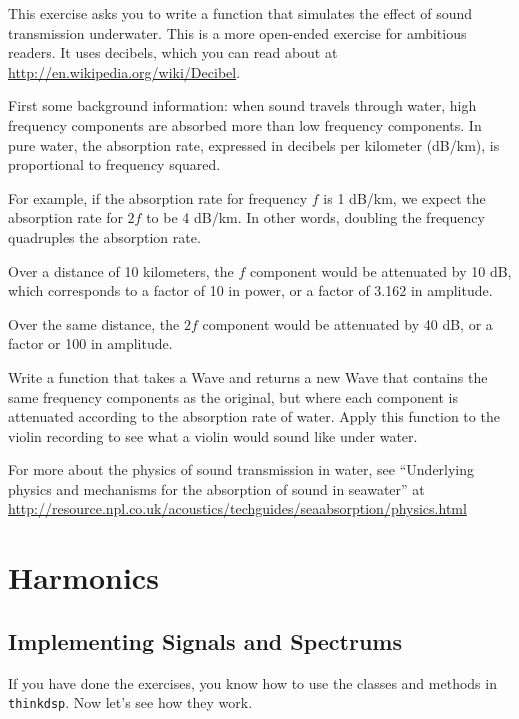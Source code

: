 \documentclass[12pt]{book}
\begin{document}
\begin{exercise}
This exercise asks you to write a function that simulates the
effect of sound transmission underwater.
This is a more open-ended exercise for ambitious readers.
It uses decibels, which you can read about at
\url{http://en.wikipedia.org/wiki/Decibel}.

First some background information: when sound travels through water,
high frequency components are absorbed more than low frequency
components.  In pure water, the absorption rate, expressed in decibels
per kilometer (dB/km), is proportional to frequency squared.

For example, if the absorption rate for frequency $f$ is 1 dB/km,
we expect the absorption rate for $2f$ to be 4 dB/km.  In other words,
doubling the frequency quadruples the absorption rate.

Over a distance of 10 kilometers, the $f$ component would be attenuated
by 10 dB, which corresponds to a factor of 10 in power, or a factor
of 3.162 in amplitude.  

Over the same distance, the $2f$ component would be attenuated by
40 dB, or a factor or 100 in amplitude.

Write a function that takes a Wave and returns a new Wave that contains
the same frequency components as the original, but where each
component is attenuated according to the absorption rate of water.
Apply this function to the violin recording to see what a violin
would sound like under water.

For more about the physics of sound transmission in water, see
``Underlying physics and mechanisms for the absorption of sound in
seawater'' at
\url{http://resource.npl.co.uk/acoustics/techguides/seaabsorption/physics.html}

\end{exercise}




\chapter{Harmonics}
\label{harmonics}


\section{Implementing Signals and Spectrums}

If you have done the exercises, you know how to use the classes and
methods in {\tt thinkdsp}.  Now let's see how they work.
\end{document}
